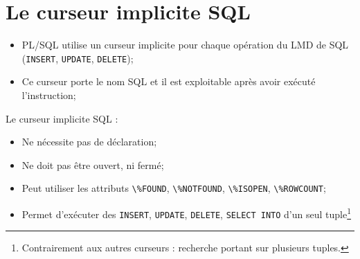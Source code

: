 \documentclass[10pt]{beamer}
\begin{document}

\section{Le curseur implicite SQL}
\begin{frame}{\secname}
    \begin{itemize}
        \item PL/SQL utilise un curseur implicite pour chaque opération du LMD de SQL (\lstinline[language=plsql]!INSERT!, \lstinline[language=plsql]!UPDATE!, \lstinline[language=plsql]!DELETE!);
        \item Ce curseur porte le nom SQL et il est exploitable après avoir exécuté l'instruction;
    \end{itemize}
\end{frame}

\begin{frame}{\secname}
    Le curseur implicite SQL :
    \begin{itemize}
        \item Ne nécessite pas de déclaration;
        \item Ne doit pas être ouvert, ni fermé;
        \item Peut utiliser les attributs \lstinline[language=plsql]!\%FOUND!, \lstinline[language=plsql]!\%NOTFOUND!, \lstinline[language=plsql]!\%ISOPEN!, \lstinline[language=plsql]!\%ROWCOUNT!;
        \item Permet d'exécuter des \lstinline[language=plsql]!INSERT!, \lstinline[language=plsql]!UPDATE!, \lstinline[language=plsql]!DELETE!, \lstinline[language=plsql]!SELECT INTO! d'un seul tuple\footnote{Contrairement aux autres curseurs : recherche portant sur plusieurs tuples.}
    \end{itemize}
\end{frame}

\begin{frame}{\secname}
    
\end{frame}

\begin{frame}[allowframebreaks]{\secname}
    
\end{frame}
\end{document}
